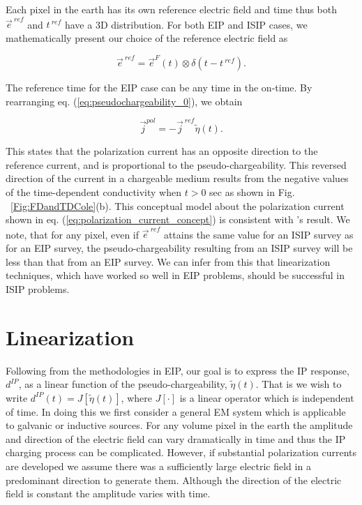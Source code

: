 \documentclass[extra,mreferee]{gji}
\renewcommand {\j}  { {\vec j} }
\newcommand {\e}  { {\vec e} }
\newcommand{\peta}{\tilde{\eta}}
\newcommand{\eref}{\e^{\ ref}}
\newcommand{\jref}{\j^{\ ref}}
\newcommand{\dip}{d^{IP}}
\begin{document}
Each pixel in the earth has its own reference electric field and time thus  both $\eref$ and $t^{\ ref}$ have a 3D distribution.
For both EIP and ISIP cases, we mathematically present our choice of the reference electric field as
\begin{linenomath*}
\begin{equation}
  \eref = \e^{F}(t) \otimes \delta(t-t^{\ ref}).
  \label{eq:reference_electricfield}
\end{equation}
\end{linenomath*}
The reference time for the EIP case can be any time in the on-time. By rearranging eq. (\ref{eq:pseudochargeability_0}), we obtain
\begin{linenomath*}
\begin{equation}
  \j^{pol} = -\jref\peta(t).
  \label{eq:polarization_current_concept}
\end{equation}
\end{linenomath*}
This states that the polarization current has an opposite direction to the reference current, and is proportional to the pseudo-chargeability.
This reversed direction of the current in a chargeable medium results from the negative values of the time-dependent conductivity when $t>$0 sec as shown in Fig. ~\ref{Fig:FDandTDCole}(b).
This conceptual model about the polarization current shown in eq. (\ref{eq:polarization_current_concept}) is consistent with \cite{seigel1959}'s result. We note, that for any pixel, even if  $\eref$  attains the same value for an ISIP survey as for an EIP survey, the pseudo-chargeability resulting from an ISIP survey will be less than that from an EIP survey. We can infer from this that linearization techniques, which have worked so well in EIP problems, should be successful in ISIP problems.

\section{Linearization}
Following from the methodologies in EIP, our goal is to express the IP response, $\dip$, as a linear function of the pseudo-chargeability,  $\peta(t)$. That is we wish to write $\dip(t) = J[\peta(t)]$, where $J[\cdot]$ is a linear operator which is independent of time. In doing this we first consider a general EM system which is applicable to galvanic or inductive sources.
For any volume pixel in the earth the amplitude and direction of the  electric field can vary dramatically in time and thus the IP charging process can be complicated. However, if substantial polarization currents are developed we assume there was a sufficiently large electric field in a predominant direction to generate them. Although the direction of the electric field is constant the amplitude varies with time.
\end{document}
